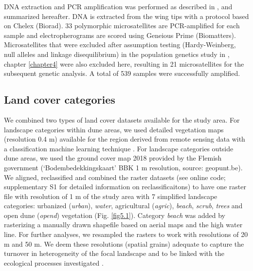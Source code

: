\documentclass[10pt, twoside]{book} %
\begin{document}
		DNA extraction and PCR amplification was performed as described in \citep[chapter \ref{chapter4}]{batsleer2022b}, and summarized hereafter. DNA is extracted from the wing tips with a protocol based on Chelex (Biorad). 33 polymorphic microsatellites are PCR-amplified for each sample and electropherograms are scored using Geneious Prime (Biomatters). Microsatellites that were excluded after assumption testing (Hardy-Weinberg, null alleles and linkage disequilibrium) in the population genetics study in \citet{batsleer2022b}, chapter \ref{chapter4} were also excluded here, resulting in 21 microsatellites for the subsequent genetic analysis. A total of 539 samples were successfully amplified.\\
		
		\subsection{Land cover categories}
		We combined two types of land cover datasets available for the study area. For landscape categories within dune areas, we used detailed vegetation maps (resolution 0.4 m) available for the region derived from remote sensing data with a classification machine learning technique \citep{bonte2021}. For landscape categories outside dune areas, we used the ground cover map 2018 provided by the Flemish government (`Bodembedekkingskaart' BBK 1 m resolution, source: geopunt.be). We aligned, reclassified and combined the raster datasets (see online code; supplementary S1 for detailed information on reclassificaitons) to have one raster file with resolution of 1 m of the study area with 7 simplified landscape categories: urbanized (\textit{urban}), \textit{water}, agricultural (\textit{agric}), \textit{beach}, \textit{scrub}, \textit{trees} and open dune (\textit{opend}) vegetation (Fig. \ref{fig5.1}). Category \textit{beach} was added by rasterizing a manually drawn shapefile based on aerial maps and the high water line. For further analyses, we resampled the rasters to work with resolutions of 20 m and 50 m. We deem these resolutions (spatial grains) adequate to capture the turnover in heterogeneity of the focal landscape and to be linked with the ecological processes investigated \citep{mcrae2008, cushman2010}.\\
		
\end{document}
